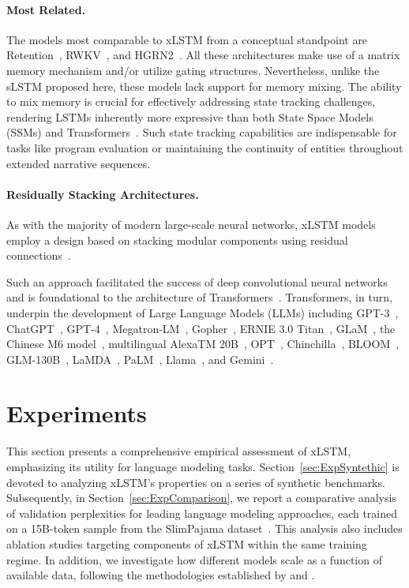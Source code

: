 \paragraph{Most Related.} The models most comparable to xLSTM from a conceptual standpoint are Retention~\citep{Sun:23arxiv}, RWKV~\citep{Peng:23arxivshort,Peng:24arxivshort}, and HGRN2~\citep{Qin:24arxiv}. All these architectures make use of a matrix memory mechanism and/or utilize gating structures. Nevertheless, unlike the sLSTM proposed here, these models lack support for memory mixing. The ability to mix memory is crucial for effectively addressing state tracking challenges, rendering LSTMs inherently more expressive than both State Space Models (SSMs) and Transformers~\citep{Merrill:24,Deletang:23}. Such state tracking capabilities are indispensable for tasks like program evaluation or maintaining the continuity of entities throughout extended narrative sequences.

\paragraph{Residually Stacking Architectures.} As with the majority of modern large-scale neural networks, xLSTM models employ a design based on stacking modular components using residual connections~\citep{Srivastava:15,He:16}.

Such an approach facilitated the success of deep convolutional neural networks~\citep{He:16} and is foundational to the architecture of Transformers~\citep{Vaswani:17}. Transformers, in turn, underpin the development of Large Language Models (LLMs) including GPT-3~\citep{Brown:20short}, ChatGPT~\citep{Schulman:22short}, GPT-4~\citep{Achiam:23gpt4short}, Megatron-LM~\citep{Shoeybi:19}, Gopher~\citep{Rae:21short}, ERNIE 3.0 Titan~\citep{Wang:21arxivshort}, GLaM~\citep{Du:21glamshort}, the Chinese M6 model~\citep{Lin:21}, multilingual AlexaTM 20B~\citep{Soltan:22}, OPT~\citep{Zhang:22opt}, Chinchilla~\citep{Hoffmann:22short}, BLOOM~\citep{Scao:22arxivshort}, GLM-130B~\citep{Zeng:22arxivshort}, LaMDA~\citep{Thoppilan:22short}, PaLM~\citep{Chowdhery:22short}, Llama~\citep{Touvron:23arxiv}, and Gemini~\citep{GeminiTeam:23arxiv,Reid:24arxiv}.

\section{Experiments}
\label{sec:Exp}

This section presents a comprehensive empirical assessment of xLSTM, emphasizing its utility for language modeling tasks. Section~\ref{sec:ExpSyntethic} is devoted to analyzing xLSTM's properties on a series of synthetic benchmarks. Subsequently, in Section~\ref{sec:ExpComparison}, we report a comparative analysis of validation perplexities for leading language modeling approaches, each trained on a 15B-token sample from the SlimPajama dataset~\citep{Soboleva:23}. This analysis also includes ablation studies targeting components of xLSTM within the same training regime. In addition, we investigate how different models scale as a function of available data, following the methodologies established by \citet{Kaplan:20} and \citet{Brown:20short}.

